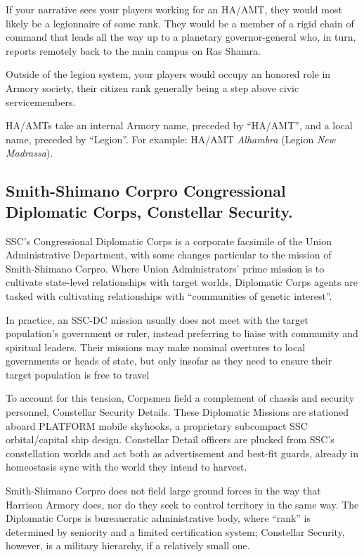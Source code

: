 If your narrative sees your players working for an HA/AMT, they would most likely be a
legionnaire of some rank. They would be a member of a rigid chain of command that leads all the
way up to a planetary governor-general who, in turn, reports remotely back to the main campus
on Ras Shamra.

Outside of the legion system, your players would occupy an honored role in Armory society, their
citizen rank generally being a step above civic servicemembers.

HA/AMTs take an internal Armory name, preceded by “HA/AMT”, and a local name, preceded by
“Legion”. For example: HA/AMT \textit{Alhambra} (Legion \textit{New Madrassa}).

\subsection{Smith-Shimano Corpro Congressional Diplomatic Corps, Constellar Security.}

SSC’s Congressional Diplomatic Corps is a corporate facsimile of the Union Administrative
Department, with some changes particular to the mission of Smith-Shimano Corpro. Where Union
Administrators’ prime mission is to cultivate state-level relationships with target worlds, Diplomatic
Corps agents are tasked with cultivating relationships with “communities of genetic interest”.

In practice, an SSC-DC mission usually does not meet with the target population’s government or
ruler, instead preferring to liaise with community and spiritual leaders. Their missions may make
nominal overtures to local governments or heads of state, but only insofar as they need to ensure
their target population is free to travel

To account for this tension, Corpsmen field a complement of chassis and security personnel,
Constellar Security Details. These Diplomatic Missions are stationed aboard PLATFORM mobile
skyhooks, a proprietary subcompact SSC orbital/capital ship design. Constellar Detail officers are
plucked from SSC’s constellation worlds and act both as advertisement and best-fit guards,
already in homeostasis sync with the world they intend to harvest.

Smith-Shimano Corpro does not field large ground forces in the way that Harrison Armory does,
nor do they seek to control territory in the same way. The Diplomatic Corps is bureaucratic
administrative body, where “rank” is determined by seniority and a limited certification system;
Constellar Security, however, is a military hierarchy, if a relatively small one.

